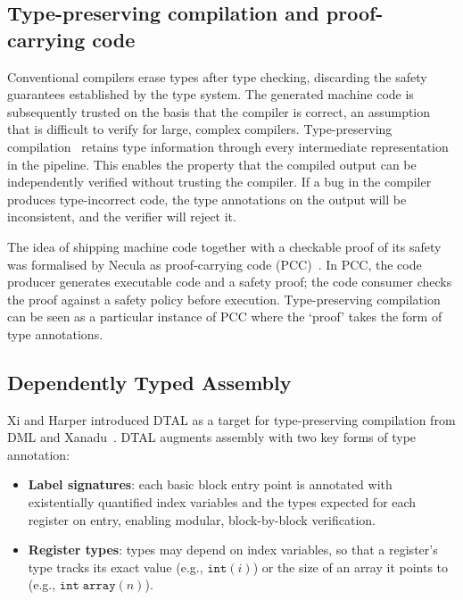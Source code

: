\subsection{Type-preserving compilation and proof-carrying code}\label{sec:type-pres-background}

Conventional compilers erase types after type checking, discarding the safety guarantees established by the type system. The generated machine code is subsequently trusted on the basis that the compiler is correct, an assumption that is difficult to verify for large, complex compilers. Type-preserving compilation~\cite{Morrisett1999SystemF} retains type information through every intermediate representation in the pipeline. This enables the property that the compiled output can be independently verified without trusting the compiler. If a bug in the compiler produces type-incorrect code, the type annotations on the output will be inconsistent, and the verifier will reject it.

The idea of shipping machine code together with a checkable proof of its safety was formalised by Necula as proof-carrying code (PCC)~\cite{Necula1997PCC}. In PCC, the code producer generates executable code and a safety proof; the code consumer checks the proof against a safety policy before execution. Type-preserving compilation can be seen as a particular instance of PCC where the `proof' takes the form of type annotations.

\subsection{Dependently Typed Assembly}\label{sec:dtal-background}

Xi and Harper introduced DTAL as a target for type-preserving compilation from DML and Xanadu~\cite{Xi1999DML,Xi2000Xanadu}. DTAL augments assembly with two key forms of type annotation:
\begin{itemize}
  \item \textbf{Label signatures}: each basic block entry point is annotated with existentially quantified index variables and the types expected for each register on entry, enabling modular, block-by-block verification.
  \item \textbf{Register types}: types may depend on index variables, so that a register's type tracks its exact value (e.g., $\mathtt{int}(i)$) or the size of an array it points to (e.g., $\mathtt{int\;array}(n)$).
\end{itemize}

